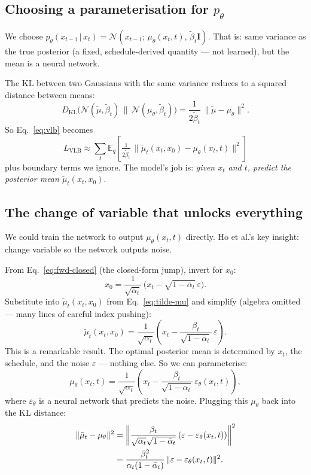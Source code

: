 \documentclass[11pt,a4paper]{article}
\newcommand{\E}{\mathbb{E}}
\newcommand{\N}{\mathcal{N}}
\newcommand{\given}{\,|\,}
\newcommand{\eps}{\varepsilon}
\begin{document}
\subsection{Choosing a parameterisation for $p_\theta$}

We choose $p_\theta(x_{t-1}\given x_t) = \N(x_{t-1};\, \mu_\theta(x_t, t),\, \tilde\beta_t \mathbf{I})$.
That is: same variance as the true posterior (a fixed, schedule-derived
quantity --- not learned), but the mean is a neural network.

The KL between two Gaussians with the same variance reduces to a
squared distance between means:
\[
D_{\mathrm{KL}}\big(\N(\tilde\mu, \tilde\beta_t)\,\|\,\N(\mu_\theta, \tilde\beta_t)\big)
   = \frac{1}{2\tilde\beta_t}\,\|\tilde\mu - \mu_\theta\|^2.
\]
So Eq.~\eqref{eq:vlb} becomes
\[
L_{\text{VLB}} \approx \sum_t \E_q\!\left[\tfrac{1}{2\tilde\beta_t}\,\|\tilde\mu_t(x_t,x_0) - \mu_\theta(x_t,t)\|^2\right]
\]
plus boundary terms we ignore. The model's job is: \emph{given $x_t$
and $t$, predict the posterior mean $\tilde\mu_t(x_t, x_0)$}.

\subsection{The change of variable that unlocks everything}

We could train the network to output $\mu_\theta(x_t, t)$ directly.
Ho et al.'s key insight: change variable so the network outputs noise.

From Eq.~\eqref{eq:fwd-closed} (the closed-form jump), invert for $x_0$:
\[
x_0 = \frac{1}{\sqrt{\bar{\alpha}_t}}\,\big(x_t - \sqrt{1-\bar{\alpha}_t}\,\eps\big).
\]
Substitute into $\tilde\mu_t(x_t, x_0)$ from Eq.~\eqref{eq:tilde-mu} and
simplify (algebra omitted --- many lines of careful index pushing):
\begin{equation}
\boxed{\;\tilde\mu_t(x_t, x_0) = \frac{1}{\sqrt{\alpha_t}}\!\left(x_t - \frac{\beta_t}{\sqrt{1-\bar{\alpha}_t}}\,\eps\right).\;}
\label{eq:mu-from-eps}
\end{equation}
This is a remarkable result. The optimal posterior mean is determined
by $x_t$, the schedule, and the noise $\eps$ --- nothing else. So we can
parameterise:
\[
\mu_\theta(x_t, t) = \frac{1}{\sqrt{\alpha_t}}\!\left(x_t - \frac{\beta_t}{\sqrt{1-\bar{\alpha}_t}}\,\eps_\theta(x_t, t)\right),
\]
where $\eps_\theta$ is a neural network that predicts the noise.
Plugging this $\mu_\theta$ back into the KL distance:
\begin{align}
\|\tilde\mu_t - \mu_\theta\|^2
   &= \left\|\frac{\beta_t}{\sqrt{\alpha_t}\sqrt{1-\bar{\alpha}_t}}\,(\eps - \eps_\theta(x_t, t))\right\|^2 \notag\\
   &= \frac{\beta_t^2}{\alpha_t(1-\bar{\alpha}_t)}\,\|\eps - \eps_\theta(x_t, t)\|^2.
\end{align}
\end{document}
